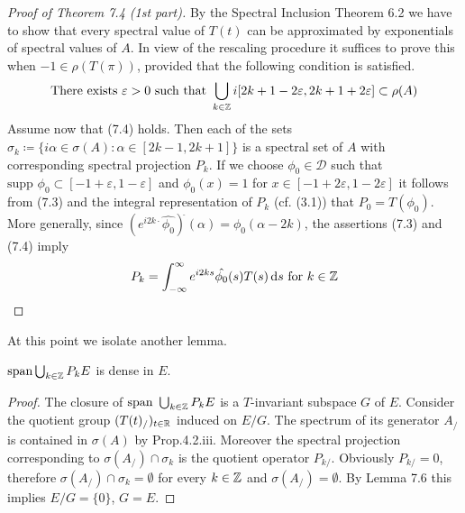 \begin{proof}[Proof of Theorem 7.4 (1st part)]
By the Spectral Inclusion Theorem 6.2 we have to show that every spectral value of $T(t)$ can be approximated by exponentials of spectral values of $A$.
In view of the rescaling procedure it suffices to prove this when $-1 \in \rho(T(\pi))$, provided that the following condition is satisfied.
\begin{equation}\label{eq:a3-7.5}
\text{There exists } \varepsilon > 0 \text{ such that } \bigcup_{k\in\mathbb{Z}} i[2k+1-2\varepsilon,2k+1+2\varepsilon] \subset \rho(A)
\end{equation}
Assume now that (7.4) holds.
Then each of the sets $\sigma_{k}\coloneqq \{i\alpha \in \sigma(A) \colon \alpha \in [2k-1,2k+1]\}$ is a spectral set of $A$ with corresponding spectral projection $P_{k}$.
If we choose $\phi_{0} \in \mathcal{D}$ such that $\text{supp }\phi_{0} \subset [-1+\varepsilon,1-\varepsilon]$ and $\phi_{0}(x) = 1$ for $x \in [-1+2\varepsilon,1-2\varepsilon]$ it follows from (7.3) and the integral representation of $P_{k}$ (cf. (3.1)) that $P_{0} = T(\phi_{0})$.
More generally, since $(e^{i2k\cdot}\hat{\phi_{0}})^{\check{}}(\alpha) = \phi_{0}(\alpha-2k)$, the assertions (7.3) and (7.4) imply
\begin{equation}\label{eq:a3-7.6}
P_{k} = \int_{-\infty}^{\infty} e^{i2ks}\hat{\phi_{0}}(s)T(s)\mathop{}\!\mathrm{d}{s} \text{ for } k \in \mathbb{Z}
\end{equation}
\end{proof}
At this point we isolate another lemma.
\begin{lemma}\label{lem:a3-7.7}
$\mathrm{span }\bigcup_{k\in\mathbb{Z}} P_{k}E$ is dense in $E$.
\end{lemma}
\begin{proof}
The closure of $\text{span }\bigcup_{k\in\mathbb{Z}} P_{k}E$ is a $T$-invariant subspace $G$ of $E$.
Consider the quotient group $(T(t)_/)_{t\in\mathbb{R}}$ induced on $E/G$.
The spectrum of its generator $A_{/}$ is contained in $\sigma(A)$ by Prop.4.2.iii.
Moreover the spectral projection corresponding to $\sigma(A_{/}) \cap \sigma_{k}$ is the quotient operator $P_{k/}$.
Obviously $P_{k/} = 0$, therefore $\sigma(A_{/}) \cap \sigma_{k} = \emptyset$ for every $k \in \mathbb{Z}$ and $\sigma(A_{/}) = \emptyset$.
By Lemma 7.6 this implies $E/G = \{0\}$, \ie $G = E$.
\end{proof}
